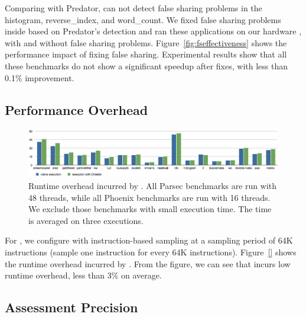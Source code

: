 Comparing with Predator, \cheetah{} can not detect false sharing problems in the histogram, reverse\_index, and word\_count. We fixed false sharing problems inside based on Predator's detection and ran these applications on our hardware , with and without false sharing problems. Figure~\ref{fig:fseffectiveness} shows the performance impact of fixing false sharing. Experimental results show that all these benchmarks do not show a significant speedup after fixes, with less than 0.1\% improvement.  

\subsection{Performance Overhead}
\label{sec:perf}

\begin{figure}[htbp]
\centering
\label{fig:overhead}
\includegraphics[width=2\columnwidth]{figure/overhead}
\caption{Runtime overhead incurred by \Cheetah{}. All Parsec benchmarks are run with 48 threads, while all Phoenix benchmarks are run with 16 threads. We exclude those benchmarks with small execution time. The time is averaged on three executions.}
\end{figure}


For \cheetah{}, we configure with instruction-based sampling at a sampling period of 64K instructions (sample one instruction for every 64K instructions). Figure~\ref{} shows the runtime overhead incurred by \cheetah{}. From the figure, we can see that \cheetah{} incurs low runtime overhead, less than 3\% on average.

\subsection{Assessment Precision}
\label{sec:precision}



